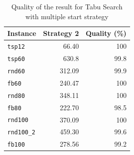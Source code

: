	\begin{table}[]
		\centering
		\begin{tabular}{lrr}
			\toprule
			\textbf{Instance} & \textbf{Strategy 2}& \textbf{Quality (\%)}\\
			\toprule
			\verb|tsp12|           & 66.40      & 100	  \\
			\verb|tsp60|           & 630.8     & 99.8    \\
			\verb|rnd60|           & 312.09     & 99.9    \\
			\verb|fb60|            & 240.47     & 100     \\
			\verb|rnd80|           & 348.11      & 100     \\
			\verb|fb80|            & 222.70      & 98.5    \\
			\verb|rnd100|          & 370.09      & 100     \\
			\verb|rnd100_2|        & 459.30      & 99.6    \\
			\verb|fb100|           & 278.56      & 99.2        \\
			\bottomrule      
		\end{tabular}
		\caption{Quality of the result for Tabu Search with multiple start strategy}
		\label{tab:ts-result-q}
	\end{table}
		
		